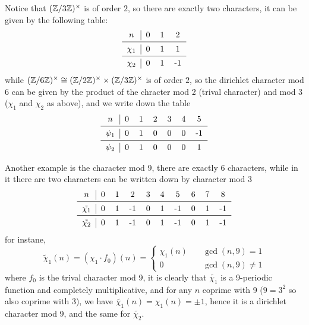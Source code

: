 \begin{example}
    Notice that \((\mathbb{Z}/3\mathbb{Z})^\times\) is of order \(2\), so there are exactly two characters, it can be given by the following table:
    \[\begin{tabular}{c| c c c c c c}
$n$      &0 &1 &2 \\
\midrule
$\chi_1$ &0 &1 &1 \\
\midrule
$\chi_2$ &0 &1 &-1 \\
\end{tabular}\]
while \((\mathbb{Z}/6\mathbb{Z})^\times \cong (\mathbb{Z}/2\mathbb{Z})^\times \times (\mathbb{Z}/3\mathbb{Z})^\times\) is of order \(2\), so the dirichlet character mod \(6\) can be given by the product of the chracter mod 2 (trival character) and mod 3 (\(\chi_1\) and \(\chi_2\) as above), and we write down the table
\[\begin{tabular}{c|cccccc}
$n$      &0 &1 &2 &3 &4 &5  \\
\midrule
$\psi_1$ &0 &1 &0 &0 &0 &-1 \\
\midrule
$\psi_2$ &0 &1 &0 &0 &0 &1 \\
    
\end{tabular}\]
\end{example}

\begin{example}
    Another example is the character mod 9, there are exactly 6 characters, while in it there are two characters can be written down by character mod 3
    \[\begin{tabular}{c|ccccccccccc}
$n$      &0 &1 &2 &3 &4 &5 &6 &7 &8  \\
\midrule
$\tilde{\chi_1}$ &0 &1 &-1 &0 &1 &-1 &0 &1 &-1 \\
\midrule
$\tilde{\chi_2}$ &0 &1 &-1 &0 &1 &-1 &0 &1 &-1\\
    \end{tabular}\]
    for instane,
    \[\tilde{\chi}_1(n) = (\chi_1 \cdot f_0)(n) = \begin{cases}
\chi_1(n) \quad &\gcd(n,9) = 1 \\
0 \quad &\gcd(n,9) \neq 1
    \end{cases}\]
    where \(f_0\) is the trival character mod 9, it is clearly that \(\tilde{\chi_1}\) is a 9-periodic function and completely multiplicative, and for any \(n\) coprime with 9 (\(9=3^2\) so also coprime with 3), we have \(\tilde{\chi_1}(n) = \chi_1(n) = \pm 1\), hence it is a dirichlet character mod 9, and the same for \(\tilde{\chi_2}\).
\end{example}

